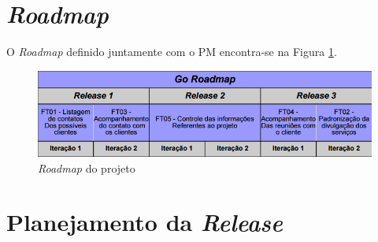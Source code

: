 \section{\textit{Roadmap}}

O \textit{Roadmap} definido juntamente com o PM encontra-se na Figura \ref{roadmap}.

\begin{figure}[!htb]
\centering
\includegraphics[scale=0.6]{figuras/roadmap.png}
\caption{\textit{Roadmap} do projeto}
\label{roadmap}
\end{figure}

\section{Planejamento da \textit{Release}}